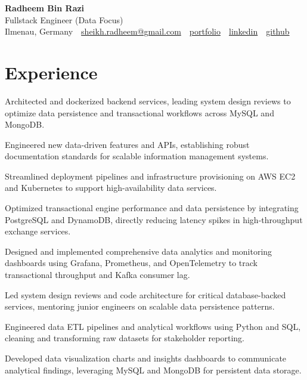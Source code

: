\documentclass[10pt,a4paper]{resume}
\makeatletter
\newcommand{\Portfolio}{https://radheem.github.io/my-cv}
\newcommand{\PortfolioText}{portfolio}
\newcommand{\GitHub}{https://github.com/radheem}
\newcommand{\LinkedIn}{https://www.linkedin.com/in/radheem-razi}
\newcommand{\Email}{sheikh.radheem@gmail.com}
\makeatother
\begin{document}
\begin{center}
  {\huge\bfseries Radheem Bin Razi}\\[3pt]
  {\large Fullstack Engineer (Data Focus)}\\[6pt]
  \small
  Ilmenau, Germany \,\textbar\,
  \href{mailto:\Email}{\Email} \,\textbar\,
  \href{\Portfolio}{\PortfolioText} \,\textbar\,
  \href{\LinkedIn}{linkedin} \,\textbar\,
  \href{\GitHub}{github}
\end{center}
\vspace{2pt}

\section{Experience}

\bullets
  \item Architected and dockerized backend services, leading system design reviews to optimize data persistence and transactional workflows across MySQL and MongoDB.
  \item Engineered new data-driven features and APIs, establishing robust documentation standards for scalable information management systems.
  \item Streamlined deployment pipelines and infrastructure provisioning on AWS EC2 and Kubernetes to support high-availability data services.
\bulletsend
\vspace{1.5pt}
\bullets
  \item Optimized transactional engine performance and data persistence by integrating PostgreSQL and DynamoDB, directly reducing latency spikes in high-throughput exchange services.
  \item Designed and implemented comprehensive data analytics and monitoring dashboards using Grafana, Prometheus, and OpenTelemetry to track transactional throughput and Kafka consumer lag.
  \item Led system design reviews and code architecture for critical database-backed services, mentoring junior engineers on scalable data persistence patterns.
\bulletsend
\vspace{1.5pt}
\bullets
  \item Engineered data ETL pipelines and analytical workflows using Python and SQL, cleaning and transforming raw datasets for stakeholder reporting.
  \item Developed data visualization charts and insights dashboards to communicate analytical findings, leveraging MySQL and MongoDB for persistent data storage.
\bulletsend
\vspace{1.5pt}
\end{document}
